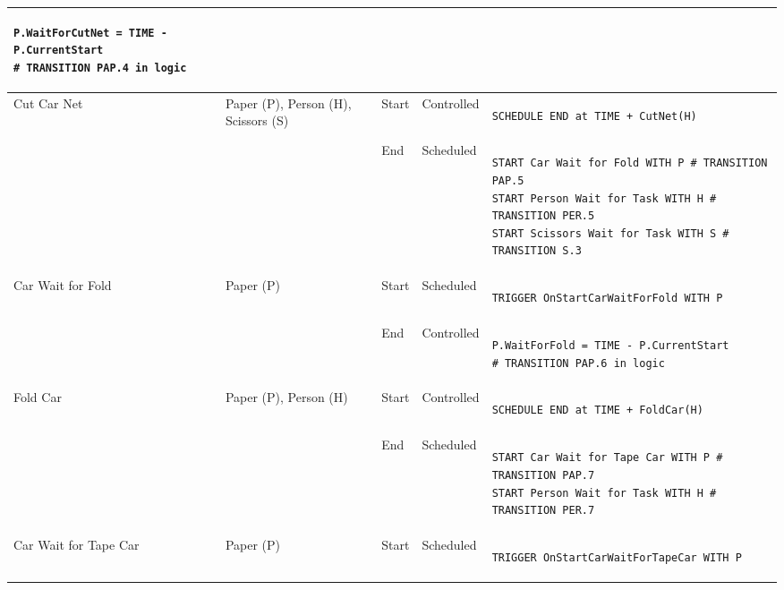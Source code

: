 \begin{longtable}{@{}>{\raggedright\arraybackslash}p{1.8cm}>{\raggedright\arraybackslash}p{2.1cm}>{\raggedright\arraybackslash}p{0.9cm}>{\raggedright\arraybackslash}p{2.2cm}>{\raggedright\arraybackslash}p{8.75cm}@{}}
\begin{lstlisting}[language=CMPseudo]
P.WaitForCutNet = TIME - P.CurrentStart
# TRANSITION PAP.4 in logic
\end{lstlisting}             \\ \midrule
  Cut Car Net               & Paper (P), Person (H), Scissors (S)     & Start & Controlled  & 
\begin{lstlisting}[language=CMPseudo]
SCHEDULE END at TIME + CutNet(H)
\end{lstlisting}             \\
  &                                                          & End   & Scheduled &
\begin{lstlisting}[language=CMPseudo]
START Car Wait for Fold WITH P # TRANSITION PAP.5
START Person Wait for Task WITH H # TRANSITION PER.5
START Scissors Wait for Task WITH S # TRANSITION S.3
\end{lstlisting}              \\ \midrule
  Car Wait for Fold         & Paper (P)                              & Start & Scheduled  & 
\begin{lstlisting}[language=CMPseudo]
TRIGGER OnStartCarWaitForFold WITH P
\end{lstlisting}             \\
  &                                                          & End   & Controlled & 
\begin{lstlisting}[language=CMPseudo]
P.WaitForFold = TIME - P.CurrentStart
# TRANSITION PAP.6 in logic
\end{lstlisting}             \\ \midrule
  Fold Car                  & Paper (P), Person (H)                  & Start & Controlled  & 
\begin{lstlisting}[language=CMPseudo]
SCHEDULE END at TIME + FoldCar(H)
\end{lstlisting}             \\
  &                                                          & End   & Scheduled & 
\begin{lstlisting}[language=CMPseudo]
START Car Wait for Tape Car WITH P # TRANSITION PAP.7
START Person Wait for Task WITH H # TRANSITION PER.7
\end{lstlisting}             \\ \midrule
  Car Wait for Tape Car     & Paper (P)                               & Start & Scheduled  & 
\begin{lstlisting}[language=CMPseudo]
TRIGGER OnStartCarWaitForTapeCar WITH P
\end{lstlisting}             \\

\end{longtable}
